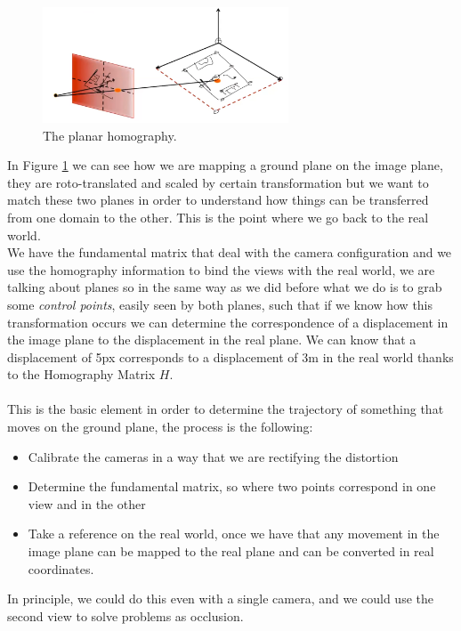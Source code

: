 \begin{figure}[H]
    \centering
    \includegraphics[width=0.65\textwidth]{Figures/homo.png}
    \caption{The planar homography.}
    \label{fig:homo}
\end{figure}

In Figure \ref{fig:homo} we can see how we are mapping a ground plane on the image plane, they are roto-translated and scaled by certain transformation but we want to match these two planes in order to understand how things can be transferred from one domain to the other. This is the point where we go back to the real world.
\\
We have the fundamental matrix that deal with the camera configuration and we use the homography information to bind the views with the real world, we are talking about planes so in the same way as we did before what we do is to grab some \textit{control points}, easily seen by both planes, such that if we know how this transformation occurs we can determine the correspondence of a displacement in the image plane to the displacement in the real plane. We can know that a displacement of 5px corresponds to a displacement of 3m in the real world thanks to the Homography Matrix \(H\).
\\\\
This is the basic element in order to determine the trajectory of something that moves on the ground plane, the process is the following:
\begin{itemize}
    \item Calibrate the cameras in a way that we are rectifying the distortion
    \item Determine the fundamental matrix, so where two points correspond in one view and in the other
    \item Take a reference on the real world, once we have that any movement in the image plane can be mapped to the real plane and can be converted in real coordinates.
\end{itemize}

In principle, we could do this even with a single camera, and we could use the second view to solve problems as occlusion. 

